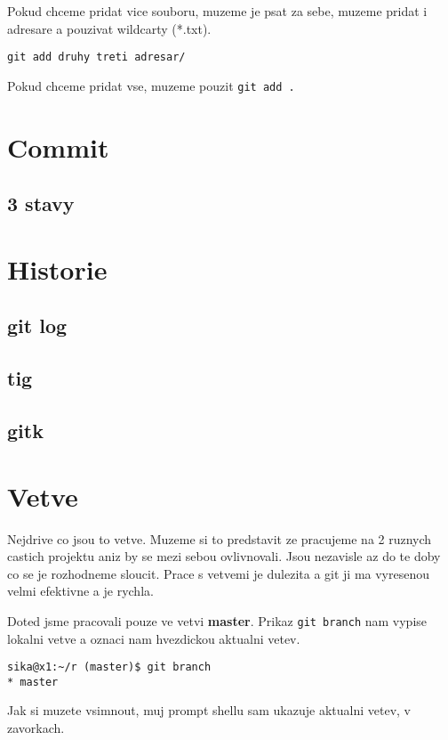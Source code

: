 \documentclass[12pt,a5paper]{article}
\begin{document}
Pokud chceme pridat vice souboru, muzeme je psat za sebe, muzeme pridat i adresare a pouzivat wildcarty (*.txt).

\begin{lstlisting}
git add druhy treti adresar/
\end{lstlisting}

Pokud chceme pridat vse, muzeme pouzit \lstinline|git add .|

\section{Commit}
\subsection{3 stavy}

\section{Historie}
\subsection{git log}
\subsection{tig}
\subsection{gitk}


\section{Vetve}

Nejdrive co jsou to vetve. Muzeme si to predstavit ze pracujeme na 2 ruznych castich projektu aniz by se mezi sebou ovlivnovali. Jsou nezavisle az do te doby co se je rozhodneme sloucit. Prace s vetvemi je dulezita a git ji ma vyresenou velmi efektivne a je rychla.

Doted jsme pracovali pouze ve vetvi {\bf master}. Prikaz \lstinline|git branch| nam vypise lokalni vetve a oznaci nam hvezdickou aktualni vetev.

\begin{lstlisting}
sika@x1:~/r (master)$ git branch
* master
\end{lstlisting}

Jak si muzete vsimnout, muj prompt shellu sam ukazuje aktualni vetev, v zavorkach.
\end{document}
